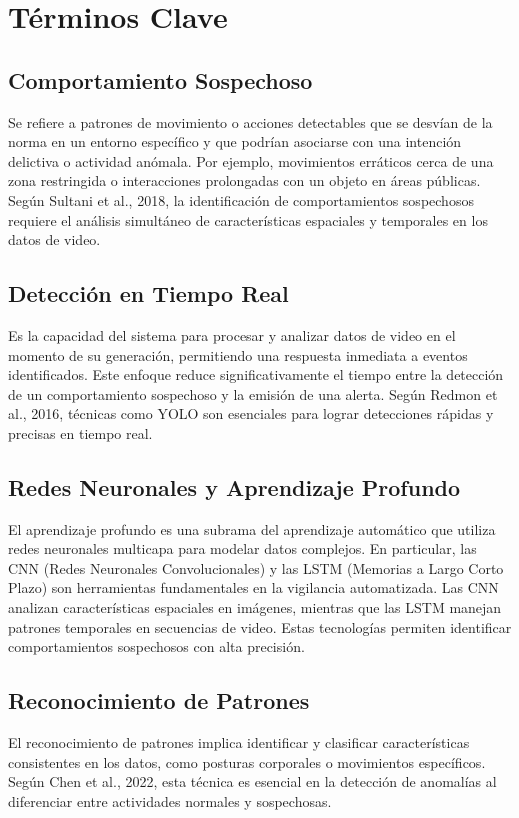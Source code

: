 \section{Términos Clave}

\subsection{Comportamiento Sospechoso}
Se refiere a patrones de movimiento o acciones detectables que se desvían de la norma en un entorno específico y que podrían asociarse con una intención delictiva o actividad anómala. Por ejemplo, movimientos erráticos cerca de una zona restringida o interacciones prolongadas con un objeto en áreas públicas. Según Sultani et al., 2018, la identificación de comportamientos sospechosos requiere el análisis simultáneo de características espaciales y temporales en los datos de video.

\subsection{Detección en Tiempo Real}
Es la capacidad del sistema para procesar y analizar datos de video en el momento de su generación, permitiendo una respuesta inmediata a eventos identificados. Este enfoque reduce significativamente el tiempo entre la detección de un comportamiento sospechoso y la emisión de una alerta. Según Redmon et al., 2016, técnicas como YOLO son esenciales para lograr detecciones rápidas y precisas en tiempo real.

\subsection{Redes Neuronales y Aprendizaje Profundo}
El aprendizaje profundo es una subrama del aprendizaje automático que utiliza redes neuronales multicapa para modelar datos complejos. En particular, las CNN (Redes Neuronales Convolucionales) y las LSTM (Memorias a Largo Corto Plazo) son herramientas fundamentales en la vigilancia automatizada. Las CNN analizan características espaciales en imágenes, mientras que las LSTM manejan patrones temporales en secuencias de video. Estas tecnologías permiten identificar comportamientos sospechosos con alta precisión.

\subsection{Reconocimiento de Patrones}
El reconocimiento de patrones implica identificar y clasificar características consistentes en los datos, como posturas corporales o movimientos específicos. Según Chen et al., 2022, esta técnica es esencial en la detección de anomalías al diferenciar entre actividades normales y sospechosas.

